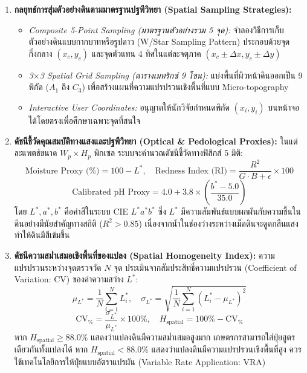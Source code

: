 \begin{enumerate}
    \item \textbf{กลยุทธ์การสุ่มตัวอย่างดินตามมาตรฐานปฐพีวิทยา (Spatial Sampling Strategies):}
    \begin{itemize}
        \item \textit{Composite 5-Point Sampling (มาตรฐานตัวอย่างรวม 5 จุด):} จำลองวิธีการเก็บตัวอย่างดินแบบกากบาทหรือรูปดาว (W/Star Sampling Pattern) ประกอบด้วยจุดกึ่งกลาง $(x_c, y_c)$ และจุดตัวแทน 4 ทิศในแต่ละจตุภาค $(x_c \pm \Delta x, y_c \pm \Delta y)$
        \item \textit{3$\times$3 Spatial Grid Sampling (ตารางเมทริกซ์ 9 โซน):} แบ่งพื้นที่ผิวหน้าดินออกเป็น 9 พิกัด ($A_1$ ถึง $C_3$) เพื่อสร้างแผนที่ความแปรปรวนเชิงพื้นที่แบบ Micro-topography
        \item \textit{Interactive User Coordinates:} อนุญาตให้นักวิจัยกำหนดพิกัด $(x_i, y_i)$ บนหน้าจอได้โดยตรงเพื่อศึกษาเฉพาะจุดที่สนใจ
    \end{itemize}

    \item \textbf{ดัชนีชี้วัดคุณสมบัติทางแสงและปฐพีวิทยา (Optical \& Pedological Proxies):}
    ในแต่ละแพตช์ขนาด $W_p \times H_p$ พิกเซล ระบบจะคำนวณดัชนีชี้วัดทางฟิสิกส์ 5 มิติ:
    \begin{equation}
        \text{Moisture Proxy (\%)} = 100 - L^*, \quad \text{Redness Index (RI)} = \frac{R^2}{G \cdot B + \epsilon} \times 100
    \end{equation}
    \begin{equation}
        \text{Calibrated pH Proxy} = 4.0 + 3.8 \times \left( \frac{b^* - 5.0}{35.0} \right)
    \end{equation}
    โดย $L^*, a^*, b^*$ คือค่าสีในระบบ CIE $L^*a^*b^*$ ซึ่ง $L^*$ มีความสัมพันธ์แบบผกผันกับความชื้นในดินอย่างมีนัยสำคัญทางสถิติ ($R^2 > 0.85$) เนื่องจากน้ำในช่องว่างระหว่างเม็ดดินจะดูดกลืนแสงทำให้ดินมีสีเข้มขึ้น

    \item \textbf{ดัชนีความสม่ำเสมอเชิงพื้นที่ของแปลง (Spatial Homogeneity Index):}
    ความแปรปรวนระหว่างจุดตรวจวัด $N$ จุด ประเมินจากสัมประสิทธิ์ความแปรปรวน (Coefficient of Variation: $\text{CV}$) ของค่าความสว่าง $L^*$:
    \begin{equation}
        \mu_{L^*} = \frac{1}{N} \sum_{i=1}^N L^*_i, \quad \sigma_{L^*} = \sqrt{ \frac{1}{N} \sum_{i=1}^N (L^*_i - \mu_{L^*})^2 }
    \end{equation}
    \begin{equation}
        \text{CV}_{\%} = \frac{\sigma_{L^*}}{\mu_{L^*}} \times 100\%, \quad H_{\text{spatial}} = 100\% - \text{CV}_{\%}
    \end{equation}
    หาก $H_{\text{spatial}} \ge 88.0\%$ แสดงว่าแปลงดินมีความสม่ำเสมอสูงมาก เกษตรกรสามารถใส่ปุ๋ยสูตรเดียวกันทั้งแปลงได้ หาก $H_{\text{spatial}} < 88.0\%$ แสดงว่าแปลงดินมีความแปรปรวนเชิงพื้นที่สูง ควรใช้เทคโนโลยีการให้ปุ๋ยแบบอัตราแปรผัน (Variable Rate Application: VRA)
\end{enumerate}


